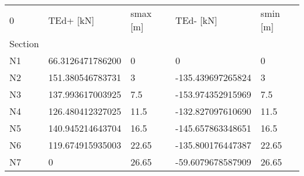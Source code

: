 \begin{tabular}{lllll}
\toprule
0 &         TEd+ [kN] & smax [m] &          TEd- [kN] & smin [m] \\
Section &                   &          &                    &          \\
\midrule
N1      &  66.3126471786200 &        0 &                  0 &        0 \\
N2      &  151.380546783731 &        3 &  -135.439697265824 &        3 \\
N3      &  137.993617003925 &      7.5 &  -153.974352915969 &      7.5 \\
N4      &  126.480412327025 &     11.5 &  -132.827097610690 &     11.5 \\
N5      &  140.945214643704 &     16.5 &  -145.657863348651 &     16.5 \\
N6      &  119.674915935003 &    22.65 &  -135.800176447387 &    22.65 \\
N7      &                 0 &    26.65 &  -59.6079678587909 &    26.65 \\
\bottomrule
\end{tabular}
